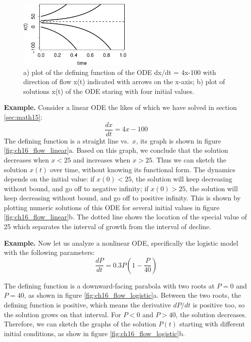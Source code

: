 \documentclass[
  letterpaper,
  DIV=11,
  numbers=noendperiod]{scrreprt}
\begin{document}
\begin{figure}

{\centering \includegraphics[width=0.5\textwidth,height=\textheight]{./graph_odes_files/figure-pdf/ch7-flow1-2.pdf}

}

\caption{a) plot of the defining function of the ODE dx/dt = 4x-100 with
direction of flow x(t) indicated with arrows on the x-axis; b) plot of
solutions x(t) of the ODE staring with four initial values.}

\end{figure}

\textbf{Example.} Consider a linear ODE the likes of which we have
solved in section \ref{sec:math15}: \[\frac{dx}{dt} = 4x -100\] The
defining function is a straight line vs.~\(x\), its graph is shown in
figure \ref{fig:ch16_flow_linear}a. Based on this graph, we conclude
that the solution decreases when \(x<25\) and increases when \(x>25\).
Thus we can sketch the solution \(x(t)\) over time, without knowing its
functional form. The dynamics depends on the initial value: if
\(x(0)<25\), the solution will keep decreasing without bound, and go off
to negative infinity; if \(x(0)>25\), the solution will keep decreasing
without bound, and go off to positive infinity. This is shown by
plotting numeric solutions of this ODE for several initial values in
figure \ref{fig:ch16_flow_linear}b. The dotted line shows the location
of the special value of 25 which separates the interval of growth from
the interval of decline.

\textbf{Example.} Now let us analyze a nonlinear ODE, specifically the
logistic model with the following parameters:
\[\frac{dP}{dt} =0.3P\left(1-\frac{P}{40}\right)\]

The defining function is a downward-facing parabola with two roots at
\(P=0\) and \(P=40\), as shown in figure \ref{fig:ch16_flow_logistic}a.
Between the two roots, the defining function is positive, which means
the derivative \(dP/dt\) is positive too, so the solution grows on that
interval. For \(P<0\) and \(P>40\), the solution decreases. Therefore,
we can sketch the graphs of the solution \(P(t)\) starting with
different initial conditions, as show in figure
\ref{fig:ch16_flow_logistic}b.
\end{document}
